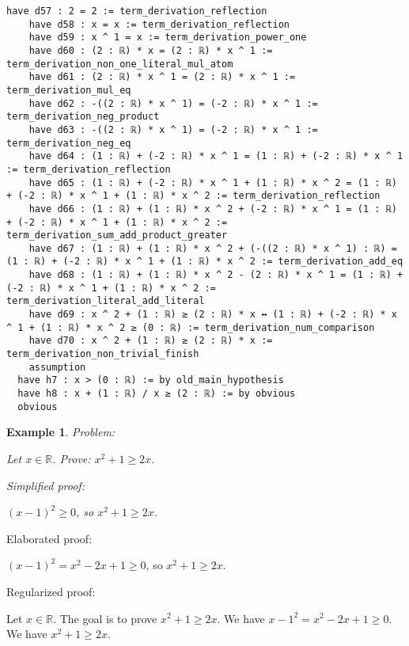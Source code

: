 \documentclass{article}
\newtheorem{example}{Example}
\begin{document}
\begin{tcolorbox}[colback=white!10, width=\linewidth]
\begin{lstlisting}[language=Lean4]
    have d57 : 2 = 2 := term_derivation_reflection
    have d58 : x = x := term_derivation_reflection
    have d59 : x ^ 1 = x := term_derivation_power_one
    have d60 : (2 : ℝ) * x = (2 : ℝ) * x ^ 1 := term_derivation_non_one_literal_mul_atom
    have d61 : (2 : ℝ) * x ^ 1 = (2 : ℝ) * x ^ 1 := term_derivation_mul_eq
    have d62 : -((2 : ℝ) * x ^ 1) = (-2 : ℝ) * x ^ 1 := term_derivation_neg_product
    have d63 : -((2 : ℝ) * x ^ 1) = (-2 : ℝ) * x ^ 1 := term_derivation_neg_eq
    have d64 : (1 : ℝ) + (-2 : ℝ) * x ^ 1 = (1 : ℝ) + (-2 : ℝ) * x ^ 1 := term_derivation_reflection
    have d65 : (1 : ℝ) + (-2 : ℝ) * x ^ 1 + (1 : ℝ) * x ^ 2 = (1 : ℝ) + (-2 : ℝ) * x ^ 1 + (1 : ℝ) * x ^ 2 := term_derivation_reflection
    have d66 : (1 : ℝ) + (1 : ℝ) * x ^ 2 + (-2 : ℝ) * x ^ 1 = (1 : ℝ) + (-2 : ℝ) * x ^ 1 + (1 : ℝ) * x ^ 2 := term_derivation_sum_add_product_greater
    have d67 : (1 : ℝ) + (1 : ℝ) * x ^ 2 + (-((2 : ℝ) * x ^ 1) : ℝ) = (1 : ℝ) + (-2 : ℝ) * x ^ 1 + (1 : ℝ) * x ^ 2 := term_derivation_add_eq
    have d68 : (1 : ℝ) + (1 : ℝ) * x ^ 2 - (2 : ℝ) * x ^ 1 = (1 : ℝ) + (-2 : ℝ) * x ^ 1 + (1 : ℝ) * x ^ 2 := term_derivation_literal_add_literal
    have d69 : x ^ 2 + (1 : ℝ) ≥ (2 : ℝ) * x ↔ (1 : ℝ) + (-2 : ℝ) * x ^ 1 + (1 : ℝ) * x ^ 2 ≥ (0 : ℝ) := term_derivation_num_comparison
    have d70 : x ^ 2 + (1 : ℝ) ≥ (2 : ℝ) * x := term_derivation_non_trivial_finish
    assumption
  have h7 : x > (0 : ℝ) := by old_main_hypothesis
  have h8 : x + (1 : ℝ) / x ≥ (2 : ℝ) := by obvious
  obvious

\end{lstlisting}
\end{tcolorbox}


\begin{example}
Problem:
\begin{tcolorbox}[colback=yellow!10, width=\linewidth]
Let $x\in\mathbb{R}$. Prove: $x^2 + 1\ge 2x$.
\end{tcolorbox}

Simplified proof:
\begin{tcolorbox}[colback=blue!10, width=\linewidth]
$(x-1)^2 \ge 0$, so $x^2 + 1 \ge 2x$.
\end{tcolorbox}
\end{example}

Elaborated proof:
\begin{tcolorbox}[colback=green!10, width=\linewidth]
$(x-1)^2 = x^2 - 2x + 1 \ge 0$, so $x^2 + 1 \ge 2x$.
\end{tcolorbox}

Regularized proof:
\begin{tcolorbox}[colback=red!10, width=\linewidth]
Let $x\in\mathbb{R}$.
The goal is to prove $x^2 + 1 \ge 2x$.
We have ${{x-1}}^2 = x^2 - 2x + 1 \ge 0$.
We have $x^2 + 1 \ge 2x$.
\end{tcolorbox}
\end{document}
